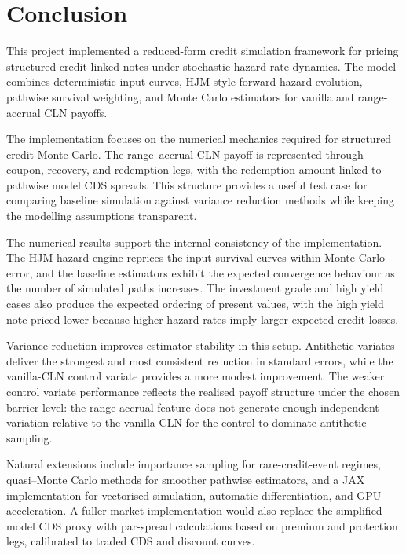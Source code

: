 \section{Conclusion}

This project implemented a reduced-form credit simulation framework for pricing structured credit-linked notes under stochastic hazard-rate dynamics. The model combines deterministic input curves, HJM-style forward hazard evolution, pathwise survival weighting, and Monte Carlo estimators for vanilla and range-accrual CLN payoffs.

The implementation focuses on the numerical mechanics required for structured credit Monte Carlo. The range–accrual CLN payoff is represented through coupon, recovery, and redemption legs, with the redemption amount linked to pathwise model CDS spreads. This structure provides a useful test case for comparing baseline simulation against variance reduction methods while keeping the modelling assumptions transparent.

The numerical results support the internal consistency of the implementation. The HJM hazard engine reprices the input survival curves within Monte Carlo error, and the baseline estimators exhibit the expected convergence behaviour as the number of simulated paths increases. The investment grade and high yield cases also produce the expected ordering of present values, with the high yield note priced lower because higher hazard rates imply larger expected credit losses.

Variance reduction improves estimator stability in this setup. Antithetic variates deliver the strongest and most consistent reduction in standard errors, while the vanilla-CLN control variate provides a more modest improvement. The weaker control variate performance reflects the realised payoff structure under the chosen barrier level: the range-accrual feature does not generate enough independent variation relative to the vanilla CLN for the control to dominate antithetic sampling.

Natural extensions include importance sampling for rare-credit-event regimes, quasi–Monte Carlo methods for smoother pathwise estimators, and a JAX implementation for vectorised simulation, automatic differentiation, and GPU acceleration. A fuller market implementation would also replace the simplified model CDS proxy with par-spread calculations based on premium and protection legs, calibrated to traded CDS and discount curves.
